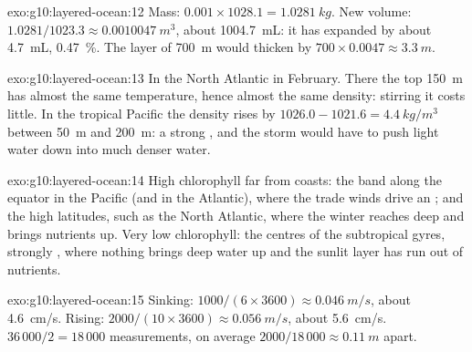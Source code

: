 \begin{solution}{exo:g10:layered-ocean:12}
Mass: $0.001 \times 1028.1 = \qty{1.0281}{kg}$. New volume: $1.0281/1023.3
\approx \qty{0.0010047}{m^3}$, about \qty{1004.7}{mL}: it has expanded by
about \qty{4.7}{mL}, \qty{0.47}{\percent}. The layer of \qty{700}{m} would
thicken by $700 \times 0.0047 \approx \qty{3.3}{m}$.
\end{solution}

\begin{solution}{exo:g10:layered-ocean:13}
In the North Atlantic in February. There the top \qty{150}{m} has almost the
same temperature, hence almost the same density: stirring it costs little.
In the tropical Pacific the density rises by $1026.0 - 1021.6 =
\qty{4.4}{kg/m^3}$ between \qty{50}{m} and \qty{200}{m}: a strong
, and the storm would have to push light water down into much
denser water.
\end{solution}

\begin{solution}{exo:g10:layered-ocean:14}
High chlorophyll far from coasts: the band along the equator in the Pacific
(and in the Atlantic), where the trade winds drive an ; and the
high latitudes, such as the North Atlantic, where the winter 
reaches deep and brings nutrients up. Very low chlorophyll: the centres of
the subtropical gyres, strongly , where nothing brings deep water
up and the sunlit layer has run out of nutrients.
\end{solution}

\begin{solution}{exo:g10:layered-ocean:15}
Sinking: $1000/(6 \times 3600) \approx \qty{0.046}{m/s}$, about
\qty{4.6}{cm/s}. Rising: $2000/(10 \times 3600) \approx \qty{0.056}{m/s}$,
about \qty{5.6}{cm/s}. $36\,000/2 = 18\,000$ measurements, on average
$2000/18\,000 \approx \qty{0.11}{m}$ apart.
\end{solution}


